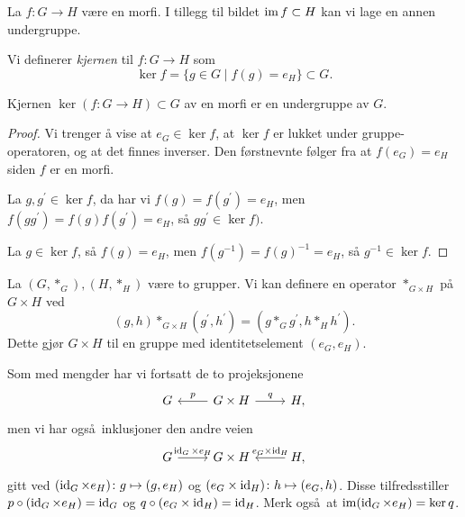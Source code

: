 La $f\colon G\to H$ være en morfi.
I tillegg til bildet $\operatorname{im} f\subset H$ kan vi lage en annen undergruppe.
\begin{definition}
    Vi definerer \textit{kjernen} til $f\colon G\to H$
    som
    \[
        \ker f = \{ g\in G\mid f(g) = e_H\} \subset G.
    \]
\end{definition}

\begin{lemma}
    Kjernen $\ker (f\colon G\to H)\subset G$ av en morfi er en undergruppe av $G$.
\end{lemma}
\begin{proof}
    Vi trenger å vise at $e_G\in \ker f$, at $\ker f$ er lukket under
    gruppe-operatoren, og at det finnes inverser.
    Den førstnevnte følger fra at $f(e_G) = e_H$ siden $f$ er en morfi.

    La $g,g^\prime \in\ker f$, da har vi $f(g) = f(g^\prime) = e_H$,
    men $f(gg^\prime) = f(g)f(g^\prime) = e_H$, så $gg^\prime\in \ker f)$.

    La $g\in \ker f$, så $f(g) = e_H$, men $f(g^{-1}) = {f(g)}^{-1} = e_H$,
    så $g^{-1}\in\ker f$.
\end{proof}

\begin{definition}
    La $(G, \ast_G), (H, \ast_H)$ være to grupper.
    Vi kan definere en operator $\ast_{G\times H}$
    på $G\times H$ ved
    \[
        (g, h)\ast_{G\times H} (g^\prime, h^\prime)
        = (g \ast_G g^\prime, h \ast_H h^\prime).
    \]
    Dette gjør $G\times H$ til en gruppe med identitetselement $(e_G, e_H)$.
\end{definition}

Som med mengder har vi fortsatt de to projeksjonene
\[\begin{tikzcd}
    G
    \rar[<-]{p}
    &
    G\times H
    \rar{q}
    &
    H,
\end{tikzcd}\]
men vi har også inklusjoner den andre veien
\[\begin{tikzcd}
    G
    \rar{\id_G\times e_H}
    &
    G\times H
    \rar[<-]{e_G\times \id_H}
    &
    H,
\end{tikzcd}\]
gitt ved $(\operatorname{id}_G\times e_H)\colon g\mapsto (g, e_H)$
og $(e_G\times \operatorname{id}_H)\colon h\mapsto (e_G, h)$.
Disse tilfredsstiller $p\circ (\operatorname{id}_G\times e_H) = \operatorname{id}_G$
og $q\circ (e_G\times \operatorname{id}_H) = \operatorname{id}_H$.
Merk også at $\operatorname{im} (\operatorname{id}_G\times e_H) = \ker q$.

